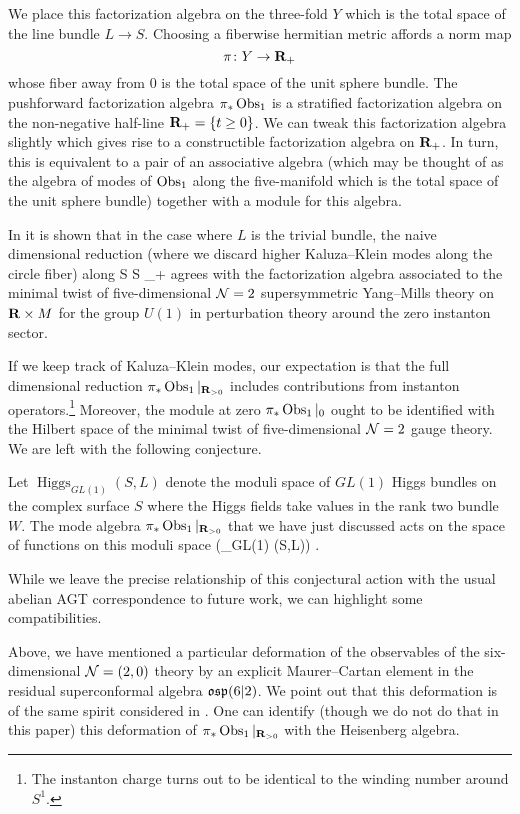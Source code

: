 We place this factorization algebra on the three-fold $Y$ which is the total space of the line bundle $L \to S$. 
Choosing a fiberwise hermitian metric affords a norm map 
\[
\pi \colon Y \to \mathbf{R}_{+}
\] 
whose fiber away from $0$ is the total space of the unit sphere bundle.
The pushforward factorization algebra $\pi_{*}\operatorname{Obs}_{1}$ is a stratified factorization algebra on the non-negative half-line $\mathbf{R}_+ = \{t \geq 0\}$. 
We can tweak this factorization algebra slightly which gives rise to a constructible factorization algebra on $\mathbf{R}_+$.
In turn, this is equivalent to a pair of an associative algebra (which may be thought of as the algebra of modes of $\operatorname{Obs}_{1}$ along the five-manifold which is the total space of the unit sphere bundle) together with a module for this algebra.

In \cite{SWtensor} it is shown that in the case where $L$ is the trivial bundle, the naive dimensional reduction (where we discard higher Kaluza--Klein modes along the circle fiber) along 
\beqn
S \times \C \to S \times \R_+
\eeqn
agrees with the factorization algebra associated to the minimal twist of five-dimensional $\mathcal N = 2$ supersymmetric Yang--Mills theory on $\mathbf{R}\times M$ for the group $U(1)$ in perturbation theory around the zero instanton sector.

If we keep track of Kaluza--Klein modes, our expectation is that the full dimensional reduction $\pi_{*}\operatorname{Obs}_{1}|_{\mathbf{R}_{>0}}$ includes contributions from instanton operators.\footnote{The instanton charge turns out to be identical to the winding number around $S^1$.} Moreover, the module at zero $\pi_{*}\operatorname{Obs}_{1}|_{0}$ ought to be identified with the Hilbert space of the minimal twist of five-dimensional $\mathcal N = 2$ gauge theory. We are left with the following conjecture.

\begin{conj}
Let $\operatorname{Higgs}_{GL(1)} (S,L)$ denote the moduli space of $GL(1)$ Higgs bundles on the complex surface $S$ where the Higgs fields take values in the rank two bundle $W$.
The mode algebra $\pi_{*}\operatorname{Obs}_{1}|_{\mathbf{R}_{>0}}$ that we have just discussed acts on the space of functions on this moduli space
\beqn
\cO \left(_{GL(1)} (S,L)\right) .
\eeqn
\end{conj}

While we leave the precise relationship of this conjectural action with the usual abelian AGT correspondence to future work, we can highlight some compatibilities.

Above, we have mentioned a particular deformation of the observables of the six-dimensional $\mathcal N = (2,0)$ theory by an explicit Maurer--Cartan element in the residual superconformal algebra $\mathfrak{osp}(6|2)$. We point out that this deformation is of the same spirit considered in \cite{BeemEtAl}. One can identify (though we do not do that in this paper) this deformation of $\pi_{*} \operatorname{Obs}_1|_{\mathbf{R}_{>0}}$ with the Heisenberg algebra.

